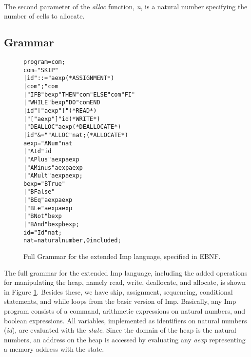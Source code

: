 \paragraph{}
The second parameter of the {\it alloc} function, {\it n}, is a natural number specifying the number of cells to allocate.

\subsection{Grammar}

\begin{figure}
\begin{alltt}
                  program = com ;
                  com =   "SKIP"
                        | id "::=" aexp            (* ASSIGNMENT *)
                        | com ";" com
                        | "IFB" bexp "THEN" com "ELSE" com "FI"
                        | "WHILE" bexp "DO" com END
                        | id \lsquigarr "[" aexp "]"       (* READ *)
                        | "[" aexp "]" \lsquigarr id       (* WRITE *)
                        | "DEALLOC" aexp           (* DEALLOCATE *)
                        | id "&=" "ALLOC" nat ;    (* ALLOCATE *)
                  aexp =  "ANum" nat
                        | "AId" id
                        | "APlus" aexp aexp
                        | "AMinus" aexp aexp
                        | "AMult" aexp aexp ;
                  bexp =  "BTrue"
                        | "BFalse"
                        | "BEq" aexp aexp
                        | "BLe" aexp aexp
                        | "BNot" bexp
                        | "BAnd" bexp bexp ;
                  id = "Id" nat ;
                  nat = natural number, 0 included ;
\end{alltt}
\caption{Full Grammar for the extended Imp language, specified in EBNF.}
\label{fig:imp_grammar}
\end{figure}

The full grammar for the extended Imp language, including the added operations for manipulating the heap, namely read, write, deallocate, and allocate, is shown in Figure \ref{fig:imp_grammar}. Besides these, we have skip, assignment, sequencing, conditional statements, and while loops from the basic version of Imp. Basically, any Imp program consists of a command, arithmetic expressions on natural numbers, and boolean expressions. All variables, implemented as identifiers on natural numbers ({\it id}), are evaluated with the {\it state}. Since the domain of the heap is the natural numbers, an address on the heap is accessed by evaluating any {\it aexp} representing a memory address with the state.

